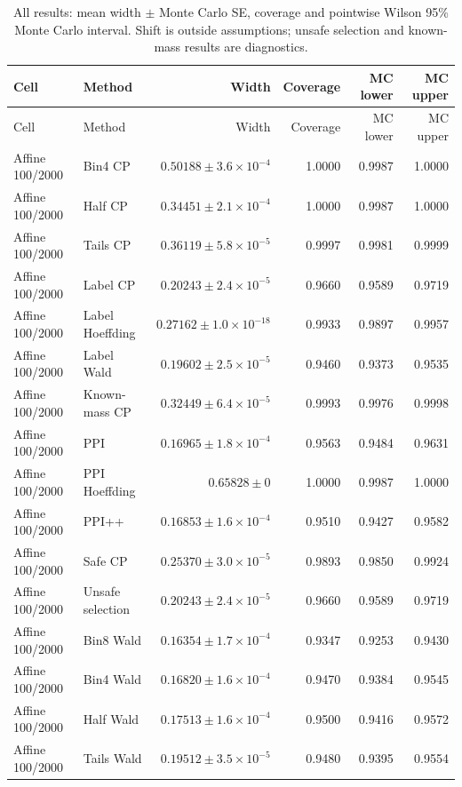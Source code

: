 \begingroup\setlength{\tabcolsep}{4pt}\small
\begin{longtable}{llrrrr}
\caption{All results: mean width $\pm$ Monte Carlo SE, coverage and pointwise Wilson 95\% Monte Carlo interval. Shift is outside assumptions; unsafe selection and known-mass results are diagnostics.}\\
\toprule Cell & Method & Width & Coverage & MC lower & MC upper\\\midrule\endfirsthead
\toprule Cell & Method & Width & Coverage & MC lower & MC upper\\\midrule\endhead
Affine 100/2000 & Bin4 CP & $0.50188\pm 3.6\times 10^{-4}$ & 1.0000 & 0.9987 & 1.0000 \\
Affine 100/2000 & Half CP & $0.34451\pm 2.1\times 10^{-4}$ & 1.0000 & 0.9987 & 1.0000 \\
Affine 100/2000 & Tails CP & $0.36119\pm 5.8\times 10^{-5}$ & 0.9997 & 0.9981 & 0.9999 \\
Affine 100/2000 & Label CP & $0.20243\pm 2.4\times 10^{-5}$ & 0.9660 & 0.9589 & 0.9719 \\
Affine 100/2000 & Label Hoeffding & $0.27162\pm 1.0\times 10^{-18}$ & 0.9933 & 0.9897 & 0.9957 \\
Affine 100/2000 & Label Wald & $0.19602\pm 2.5\times 10^{-5}$ & 0.9460 & 0.9373 & 0.9535 \\
Affine 100/2000 & Known-mass CP & $0.32449\pm 6.4\times 10^{-5}$ & 0.9993 & 0.9976 & 0.9998 \\
Affine 100/2000 & PPI & $0.16965\pm 1.8\times 10^{-4}$ & 0.9563 & 0.9484 & 0.9631 \\
Affine 100/2000 & PPI Hoeffding & $0.65828\pm 0$ & 1.0000 & 0.9987 & 1.0000 \\
Affine 100/2000 & PPI++ & $0.16853\pm 1.6\times 10^{-4}$ & 0.9510 & 0.9427 & 0.9582 \\
Affine 100/2000 & Safe CP & $0.25370\pm 3.0\times 10^{-5}$ & 0.9893 & 0.9850 & 0.9924 \\
Affine 100/2000 & Unsafe selection & $0.20243\pm 2.4\times 10^{-5}$ & 0.9660 & 0.9589 & 0.9719 \\
Affine 100/2000 & Bin8 Wald & $0.16354\pm 1.7\times 10^{-4}$ & 0.9347 & 0.9253 & 0.9430 \\
Affine 100/2000 & Bin4 Wald & $0.16820\pm 1.6\times 10^{-4}$ & 0.9470 & 0.9384 & 0.9545 \\
Affine 100/2000 & Half Wald & $0.17513\pm 1.6\times 10^{-4}$ & 0.9500 & 0.9416 & 0.9572 \\
Affine 100/2000 & Tails Wald & $0.19512\pm 3.5\times 10^{-5}$ & 0.9480 & 0.9395 & 0.9554 \\

\end{longtable}
